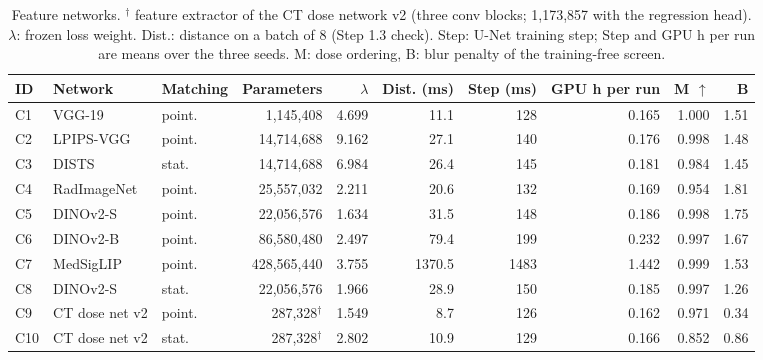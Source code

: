 \begin{table}[t]
\centering
\footnotesize
\setlength{\tabcolsep}{3pt}
\caption{Feature networks. $^{\dagger}$ feature extractor of the CT dose network v2 (three conv blocks; 1,173,857 with the regression head). $\lambda$: frozen loss weight. Dist.: distance on a batch of 8 (Step 1.3 check). Step: U-Net training step; Step and GPU h per run are means over the three seeds. M: dose ordering, B: blur penalty of the training-free screen.}
\label{tab:networks}
\begin{tabular}{lllrrrrrrr}
\toprule
ID & Network & Matching & Parameters & $\lambda$ & Dist. (ms) & Step (ms) & GPU h per run & M $\uparrow$ & B \\
\midrule
C1 & VGG-19 & point. & 1,145,408 & 4.699 & 11.1 & 128 & 0.165 & 1.000 & 1.51 \\
C2 & LPIPS-VGG & point. & 14,714,688 & 9.162 & 27.1 & 140 & 0.176 & 0.998 & 1.48 \\
C3 & DISTS & stat. & 14,714,688 & 6.984 & 26.4 & 145 & 0.181 & 0.984 & 1.45 \\
C4 & RadImageNet & point. & 25,557,032 & 2.211 & 20.6 & 132 & 0.169 & 0.954 & 1.81 \\
C5 & DINOv2-S & point. & 22,056,576 & 1.634 & 31.5 & 148 & 0.186 & 0.998 & 1.75 \\
C6 & DINOv2-B & point. & 86,580,480 & 2.497 & 79.4 & 199 & 0.232 & 0.997 & 1.67 \\
C7 & MedSigLIP & point. & 428,565,440 & 3.755 & 1370.5 & 1483 & 1.442 & 0.999 & 1.53 \\
C8 & DINOv2-S & stat. & 22,056,576 & 1.966 & 28.9 & 150 & 0.185 & 0.997 & 1.26 \\
C9 & CT dose net v2 & point. & 287,328$^{\dagger}$ & 1.549 & 8.7 & 126 & 0.162 & 0.971 & 0.34 \\
C10 & CT dose net v2 & stat. & 287,328$^{\dagger}$ & 2.802 & 10.9 & 129 & 0.166 & 0.852 & 0.86 \\
\bottomrule
\end{tabular}
\end{table}
